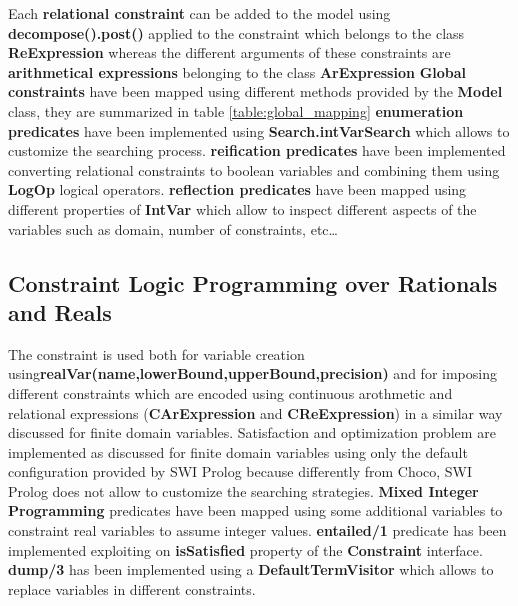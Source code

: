 Each \textbf{relational constraint} can be added to the model using \textbf{decompose().post()} applied to the constraint which
belongs to the class \textbf{ReExpression} whereas the different arguments of these constraints are \textbf{arithmetical expressions} 
belonging to the class \textbf{ArExpression}
\textbf{Global constraints} have been mapped using different methods provided by the \textbf{Model} class, they
are summarized in table \ref{table:global_mapping}
\textbf{enumeration predicates} have been implemented using \textbf{Search.intVarSearch} which allows to customize
the searching process.\newline
\textbf{reification predicates} have been implemented converting relational constraints to boolean variables and
combining them using \textbf{LogOp} logical operators.
\textbf{reflection predicates} have been mapped using different properties of \textbf{IntVar} which
allow to inspect different aspects of the variables such as domain, number of constraints, etc\dots

\subsection{Constraint Logic Programming over Rationals and Reals}\label{subsec:map_clpqr}
The constraint \textbf{{}} is used both for variable creation using\newline\textbf{realVar(name,lowerBound,upperBound,precision)}
and for imposing different constraints which are encoded using continuous arothmetic and relational expressions
(\textbf{CArExpression} and \textbf{CReExpression}) in a similar way discussed for finite domain variables.\newline
Satisfaction and optimization problem are implemented as discussed for finite domain variables using only the default configuration
provided by SWI Prolog because differently from Choco, SWI Prolog does not allow to customize the searching strategies.\newline
\textbf{Mixed Integer Programming} predicates have been mapped using  some additional variables to constraint real variables to
assume integer values.\newline
\textbf{entailed/1} predicate has been implemented exploiting on \textbf{isSatisfied} property of the \textbf{Constraint} interface.\newline
\textbf{dump/3} has been implemented using a \textbf{DefaultTermVisitor} which allows to replace variables in different constraints.

